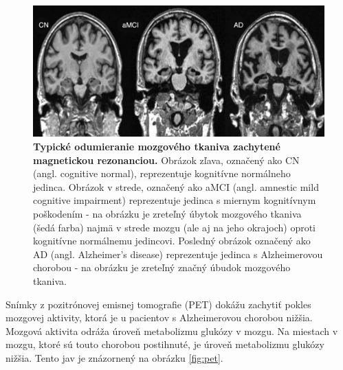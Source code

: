 \begin{figure}[h!]
\centering
\includegraphics[scale=0.3]{assets/images/mri_brain_antrophy.png}
\caption{\textbf{Typické odumieranie mozgového tkaniva zachytené magnetickou rezonanciou.} Obrázok zľava, označený ako CN (angl. cognitive normal), reprezentuje kognitívne normálneho jedinca. Obrázok v strede, označený ako aMCI (angl. amnestic mild cognitive impairment) reprezentuje jedinca s miernym kognitívnym poškodením - na obrázku je zreteľný úbytok mozgového tkaniva (šedá farba) najmä v strede mozgu (ale aj na jeho okrajoch) oproti kognitívne normálnemu jedincovi. Posledný obrázok označený ako AD (angl. Alzheimer’s disease) reprezentuje jedinca s Alzheimerovou chorobou - na obrázku je zreteľný značný úbudok mozgového tkaniva. \cite{khan2016biomarkers}
} 
\label{fig:mri_brain_antrophy}
\end{figure}

Snímky z pozitrónovej emisnej tomografie (PET) dokážu zachytiť pokles mozgovej aktivity, ktorá je u pacientov s Alzheimerovou chorobou nižšia. Mozgová aktivita odráža úroveň metabolizmu glukózy v mozgu. Na miestach v mozgu, ktoré sú touto chorobou postihnuté, je úroveň metabolizmu glukózy nižšia. Tento jav je znázornený na obrázku \ref{fig:pet}.

